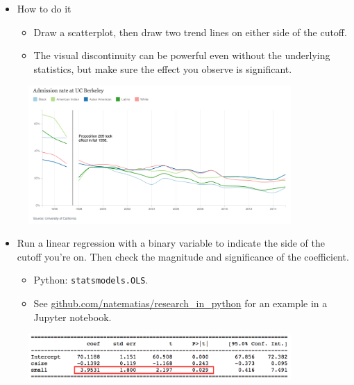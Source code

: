 \documentclass{beamer}
\begin{document}
\begin{frame}
	\begin{itemize}
		\item How to do it
		\begin{itemize}
			\item Draw a scatterplot, then draw two trend lines on either side of the cutoff.
			\item The visual discontinuity can be powerful even without the underlying statistics, but make sure the effect you observe is significant.
		\end{itemize}
	\end{itemize}
	\begin{figure}
		\includegraphics[width=10cm]{affirmative-action.png}
		\centering
	\end{figure}
\end{frame}

\begin{frame}
	\begin{itemize}
		\item Run a linear regression with a binary variable to indicate the side of the cutoff you're on. Then check the magnitude and significance of the coefficient.
			\begin{itemize}
				\item Python: \texttt{statsmodels.OLS}.
				\item See \url{github.com/natematias/research_in_python} for an example in a Jupyter notebook.
			\end{itemize}
	\end{itemize}
	\begin{figure}
		\includegraphics[width=10cm]{matias-coeff.png}
		\centering
	\end{figure}
\end{frame}
\end{document}
